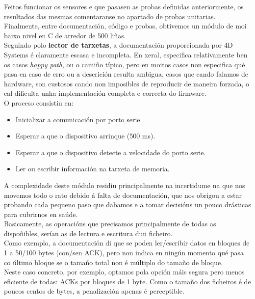    Feitos funcionar os sensores e que pasasen as probas definidas anteriormente,
   os resultados das mesmas comentaranse no apartado de probas unitarias. \\
   
   Finalmente, entre documentación, código e probas, obtivemos un módulo de moi
   baixo nivel en C de arredor de 500 liñas. \\
   
   Seguindo polo \textbf{lector de tarxetas}, a documentación proporcionada por
   4D Systems \cite{MicroDriveG1} é claramente escasa e incompleta. En xeral,
   especifica relativamente ben os casos \textit{happy path}, ou o camiño
   típico, pero en moitos casos non especifica qué pasa en caso de erro ou a
   descrición resulta ambigua, casos que cando falamos de hardware, son custosos
   cando non imposibles de reproducir de maneira forzada, o cal dificulta unha
   implementación completa e correcta do firmware. \\
   
   O proceso consistiu en:
    
   \begin{itemize}
    \item Inicializar a comunicación por porto serie.
    \item Esperar a que o dispositivo arrinque (500 ms).
    \item Esperar a que o dispositivo detecte a velocidade do porto serie.
    \item Ler ou escribir información na tarxeta de memoria.
   \end{itemize}
   
   A complexidade deste módulo residiu principalmente na incertidume na que nos
   movemos todo o rato debido á falta de documentación, que nos obrigou a estar
   probando cada pequeno paso que dabamos e a tomar decisións un pouco drásticas
   para cubrirnos en saúde. \\
   
   Basicamente, as operacións que precisamos principalmente de todas as
   dispoñibles, serían as de lectura e escritura dun ficheiro. \\
   
   Como exemplo, a documentación di que se poden ler/escribir datos en bloques
   de 1 a 50/100 bytes (con/sen ACK), pero non indica en ningún momento qué pasa
   co último bloque se o tamaño total non é múltiplo do tamaño de bloque. \\
   
   Neste caso concreto, por exemplo, optamos pola opción máis segura pero menos
   eficiente de todas: ACKs por bloques de 1 byte. Como o tamaño dos ficheiros
   é de poucos centos de bytes, a penalización apenas é perceptible. \\
   
